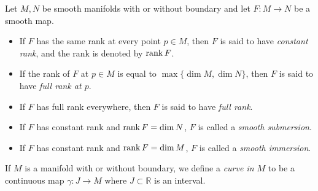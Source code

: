 \begin{defn}
  Let $M, N$ be smooth manifolds with or without boundary and let $F: M \rightarrow N$ be a smooth map.
  \begin{itemize}
    \item
      If $F$ has the same rank at every point $p \in M$, then $F$ is said to have \textit{constant rank}, and the rank is denoted by $\rank F$.
    \item
      If the rank of $F$ at $p \in M$ is equal to $\max \{ \dim M, \dim N \}$, then $F$ is said to have \textit{full rank at $p$}.
    \item
      If $F$ has full rank everywhere, then $F$ is said to have \textit{full rank}.
    \item
      If $F$ has constant rank and $\rank F = \dim N$, $F$ is called a \textit{smooth submersion}.
    \item
      If $F$ has constant rank and $\rank F = \dim M$, $F$ is called a \textit{smooth immersion}.
  \end{itemize}
\end{defn}

\begin{defn}[Curve]
  If $M$ is a manifold with or without boundary, we define a \textit{curve in $M$} to be a continuous map $\gamma: J \rightarrow M$ where $J \subset \mathbb{R}$ is an interval.
\end{defn}

